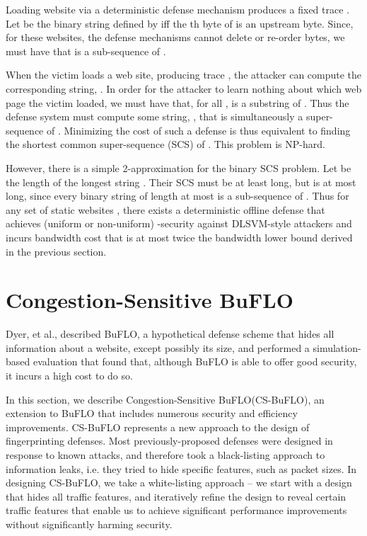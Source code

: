\documentclass[10pt,journal]{IEEEtran}
\newcommand{\buflo} {BuFLO\xspace}
\newcommand{\csbuflo} {Congestion-Sensitive BuFLO\xspace}
\newcommand{\csb} {CS-BuFLO\xspace}
\begin{document}
Loading website  via a deterministic defense mechanism produces a
fixed trace . Let  be the binary string defined by
 iff the th byte of  is an upstream byte.  Since,
for these websites, the defense mechanisms cannot delete or re-order
bytes, we must have that  is a sub-sequence of .

When the victim loads a web site, producing trace , the attacker
can compute the corresponding string, .  In order for the attacker
to learn nothing about which web page the victim loaded, we must have
that, for all ,  is a substring of .
Thus
the defense system must compute some string, , that is
simultaneously a super-sequence of .  Minimizing the
cost of such a defense is thus equivalent to finding the
shortest common super-sequence (SCS) of .
This problem is NP-hard\cite{SCS_SR8}.

However, there is a simple 2-approximation for the binary SCS problem.
Let  be the length of the longest string .  Their
SCS must be at least  long, but is at most  long, since
every binary string of length at most  is a sub-sequence of
.  Thus for any set of static websites ,
there exists a deterministic offline defense that achieves (uniform or
non-uniform) -security against DLSVM-style attackers and
incurs bandwidth cost that is at most twice the bandwidth lower bound
derived in the previous section.



\section{\csbuflo}
\label{sec:design}

Dyer, et al., described \buflo, a hypothetical defense scheme that
hides all information about a website, except possibly its size, and
performed a simulation-based evaluation that found that, although
\buflo is able to offer good security, it incurs a high cost to do so.

In this section, we describe \csbuflo (\csb), an extension to \buflo that
includes numerous security and efficiency improvements.  \csb
represents a new approach to the design of fingerprinting defenses.
Most previously-proposed defenses were designed in response to known
attacks, and therefore took a black-listing approach to information
leaks, i.e. they tried to hide specific features, such as packet
sizes.  In designing \csb, we take a white-listing approach -- we
start with a design that hides all traffic features, and iteratively
refine the design to reveal certain traffic features that enable us to
achieve significant performance improvements without significantly
harming security.
\end{document}
